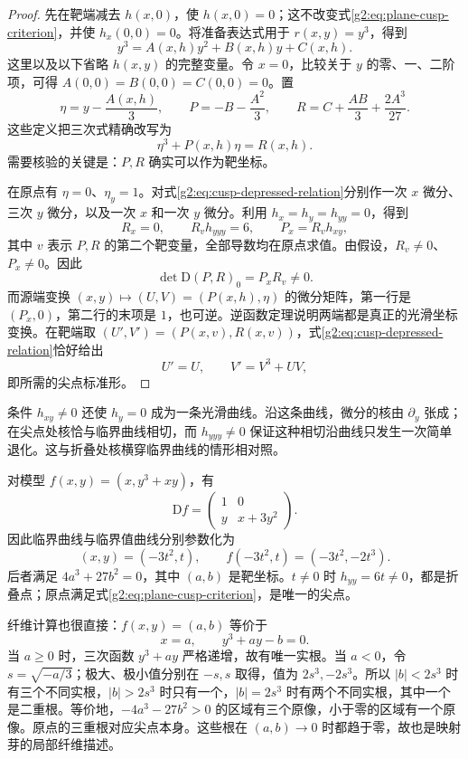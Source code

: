 \begin{proof}
	先在靶端减去 \(h(x,0)\)，使 \(h(x,0)=0\)；这不改变式\eqref{g2:eq:plane-cusp-criterion}，并使 \(h_x(0,0)=0\)。将准备表达式用于 \(r(x,y)=y^3\)，得到
	\[
		y^3=A(x,h)y^2+B(x,h)y+C(x,h).
	\]
	这里以及以下省略 \(h(x,y)\) 的完整变量。令 \(x=0\)，比较关于 \(y\) 的零、一、二阶项，可得 \(A(0,0)=B(0,0)=C(0,0)=0\)。置
	\[
		\eta=y-\frac{A(x,h)}3,\qquad
		P=-B-\frac{A^2}{3},\qquad
		R=C+\frac{AB}{3}+\frac{2A^3}{27}.
	\]
	这些定义把三次式精确改写为
	\begin{equation}\label{g2:eq:cusp-depressed-relation}
		\eta^3+P(x,h)\eta=R(x,h).
	\end{equation}
	需要核验的关键是：\(P,R\) 确实可以作为靶坐标。

	在原点有 \(\eta=0\)、\(\eta_y=1\)。对式\eqref{g2:eq:cusp-depressed-relation}分别作一次 \(x\) 微分、三次 \(y\) 微分，以及一次 \(x\) 和一次 \(y\) 微分。利用 \(h_x=h_y=h_{yy}=0\)，得到
	\[
		R_x=0,\qquad R_v h_{yyy}=6,\qquad P_x=R_v h_{xy},
	\]
	其中 \(v\) 表示 \(P,R\) 的第二个靶变量，全部导数均在原点求值。由假设，\(R_v\ne0\)、\(P_x\ne0\)。因此
	\[
		\det\mathrm D(P,R)_0=P_xR_v\ne0.
	\]
	而源端变换 \((x,y)\mapsto(U,V)=(P(x,h),\eta)\) 的微分矩阵，第一行是 \((P_x,0)\)，第二行的末项是 \(1\)，也可逆。逆函数定理说明两端都是真正的光滑坐标变换。在靶端取 \((U',V')=(P(x,v),R(x,v))\)，式\eqref{g2:eq:cusp-depressed-relation}恰好给出
	\[
		U'=U,\qquad V'=V^3+UV,
	\]
	即所需的尖点标准形。
\end{proof}

条件 \(h_{xy}\ne0\) 还使 \(h_y=0\) 成为一条光滑曲线。沿这条曲线，微分的核由 \(\partial_y\) 张成；在尖点处核恰与临界曲线相切，而 \(h_{yyy}\ne0\) 保证这种相切沿曲线只发生一次简单退化。这与折叠处核横穿临界曲线的情形相对照。

\begin{example}\label{g2:exm:plane-cusp-model}
	对模型 \(f(x,y)=(x,y^3+xy)\)，有
	\[
		\mathrm Df=\begin{pmatrix}1&0\\y&x+3y^2\end{pmatrix}.
	\]
	因此临界曲线与临界值曲线分别参数化为
	\[
		(x,y)=(-3t^2,t),\qquad f(-3t^2,t)=(-3t^2,-2t^3).
	\]
	后者满足 \(4a^3+27b^2=0\)，其中 \((a,b)\) 是靶坐标。\(t\ne0\) 时 \(h_{yy}=6t\ne0\)，都是折叠点；原点满足式\eqref{g2:eq:plane-cusp-criterion}，是唯一的尖点。

	纤维计算也很直接：\(f(x,y)=(a,b)\) 等价于
	\[
		x=a,\qquad y^3+ay-b=0.
	\]
	当 \(a\ge0\) 时，三次函数 \(y^3+ay\) 严格递增，故有唯一实根。当 \(a<0\)，令 \(s=\sqrt{-a/3}\)；极大、极小值分别在 \(-s,s\) 取得，值为 \(2s^3,-2s^3\)。所以 \(|b|<2s^3\) 时有三个不同实根，\(|b|>2s^3\) 时只有一个，\(|b|=2s^3\) 时有两个不同实根，其中一个是二重根。等价地，\(-4a^3-27b^2>0\) 的区域有三个原像，小于零的区域有一个原像。原点的三重根对应尖点本身。这些根在 \((a,b)\to0\) 时都趋于零，故也是映射芽的局部纤维描述。
\end{example}

